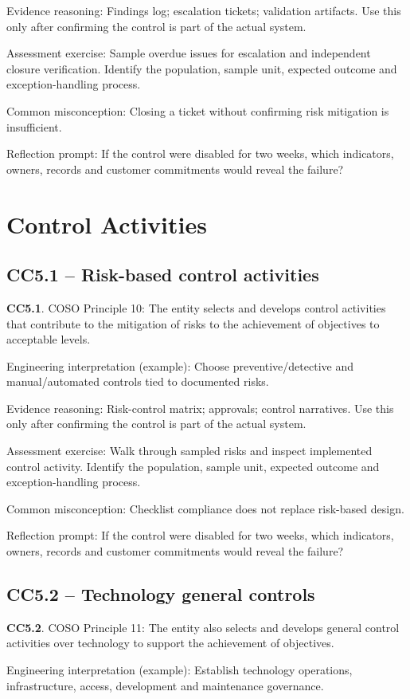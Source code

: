\documentclass[10pt,oneside]{report}
\begin{document}
Evidence reasoning: Findings log; escalation tickets; validation artifacts. Use this only after confirming the control is part of the actual system.

Assessment exercise: Sample overdue issues for escalation and independent closure verification. Identify the population, sample unit, expected outcome and exception-handling process.

Common misconception: Closing a ticket without confirming risk mitigation is insufficient.

Reflection prompt: If the control were disabled for two weeks, which indicators, owners, records and customer commitments would reveal the failure?

\section{Control Activities}
\subsection{CC5.1 -- Risk-based control activities}
\begin{aicpabox}
\textbf{CC5.1}. COSO Principle 10: The entity selects and develops control activities that contribute to the mitigation of risks to the achievement of objectives to acceptable levels.\par{}
\end{aicpabox}
Engineering interpretation (example): Choose preventive/detective and manual/automated controls tied to documented risks.

Evidence reasoning: Risk-control matrix; approvals; control narratives. Use this only after confirming the control is part of the actual system.

Assessment exercise: Walk through sampled risks and inspect implemented control activity. Identify the population, sample unit, expected outcome and exception-handling process.

Common misconception: Checklist compliance does not replace risk-based design.

Reflection prompt: If the control were disabled for two weeks, which indicators, owners, records and customer commitments would reveal the failure?

\subsection{CC5.2 -- Technology general controls}
\begin{aicpabox}
\textbf{CC5.2}. COSO Principle 11: The entity also selects and develops general control activities over technology to support the achievement of objectives.\par{}
\end{aicpabox}
Engineering interpretation (example): Establish technology operations, infrastructure, access, development and maintenance governance.
\end{document}
